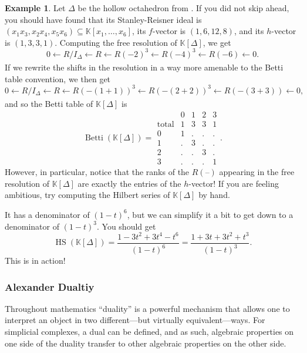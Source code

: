 \documentclass[12pt,a4paper]{article}
\newcommand{\KK}{\mathbb{K}}
\DeclareMathOperator{\Betti}{Betti}
\DeclareMathOperator{\HS}{HS}
\theoremstyle{definition}
\newtheorem{example}[theorem]{Example}
\numberwithin{equation}{section}
\begin{document}
\begin{example}
    Let $\Delta$ be the hollow octahedron from .
    If you did not skip ahead, you should have found that its Stanley-Reisner ideal is $(x_1 x_3, x_2 x_4, x_5 x_6) \subseteq \KK[x_1,\dots,x_6]$, its $f$-vector is $(1,6,12,8)$, and its $h$-vector is $(1,3,3,1)$.
    Computing the free resolution of $\KK[\Delta]$, we get
    \begin{equation*}
        0 \leftarrow R/I_\Delta \leftarrow R \xleftarrow[]{} R(-2)^3 \xleftarrow[]{} R(-4)^3 \xleftarrow[]{} R(-6) \leftarrow 0.
    \end{equation*}
    If we rewrite the shifts in the resolution in a way more amenable to the Betti table convention, we then get
    \begin{equation*}
        0 \leftarrow R/I_\Delta \leftarrow R \xleftarrow[]{} R(-(1+1))^3 \xleftarrow[]{} R(-(2+2))^3 \xleftarrow[]{} R(-(3+3)) \leftarrow 0,
    \end{equation*}
    and so the Betti table of $\KK[\Delta]$ is
    \begin{equation*}
        \Betti(\KK[\Delta]) =
        \begin{array}{r|cccc}
          & 0 & 1 & 2 & 3 \\
        \hline
        \text{total} & 1 & 3 & 3 & 1 \\
        \hline
         0 & 1 & . & . & . \\
         1 & . & 3 & . & . \\
         2 & . & . & 3 & . \\
         3 & . & . & . & 1
    \end{array}.
    \end{equation*}
    However, in particular, notice that the ranks of the $R(\text{--})$ appearing in the free resolution of $\KK[\Delta]$ are exactly the entries of the $h$-vector!
    If you are feeling ambitious, try computing the Hilbert series of $\KK[\Delta]$ by hand.
    
    It has a denominator of $(1-t)^6$, but we can simplify it a bit to get down to a denominator of $(1-t)^3$.
    You should get
    \begin{equation*}
        \HS(\KK[\Delta]) = \frac{1 - 3t^2 + 3t^4 - t^6}{(1-t)^6} = \frac{1 + 3t + 3t^2 + t^3}{(1-t)^3}.
    \end{equation*}
    This is  in action!
\end{example}

\subsubsection{Alexander Dualtiy}
Throughout mathematics ``duality'' is a powerful mechanism that allows one to interpret an object in two different---but virtually equivalent---ways.
For simplicial complexes, a dual can be defined, and as such, algebraic properties on one side of the duality transfer to other algebraic properties on the other side. 
\end{document}
